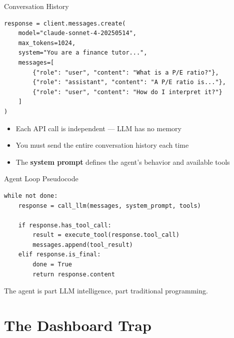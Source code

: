 \documentclass[aspectratio=169]{beamer}
\begin{document}
\begin{frame}[fragile,shrink=5]{Conversation History}
\begin{shadedbox}[title=\textbf{Messages Are a List of Dictionaries}]
\begin{verbatim}
response = client.messages.create(
    model="claude-sonnet-4-20250514",
    max_tokens=1024,
    system="You are a finance tutor...",
    messages=[
        {"role": "user", "content": "What is a P/E ratio?"},
        {"role": "assistant", "content": "A P/E ratio is..."},
        {"role": "user", "content": "How do I interpret it?"}
    ]
)
\end{verbatim}
\end{shadedbox}
\vspace{0.3cm}
\begin{itemize}\small
  \item Each API call is independent --- LLM has no memory
  \item You must send the \alert{entire conversation history} each time
  \item The \textbf{system prompt} defines the agent's behavior and available tools
\end{itemize}
\end{frame}

\begin{frame}[fragile]{Agent Loop Pseudocode}
\begin{shadedbox}[title=\textbf{The Agent's Decision Loop}]
\begin{verbatim}
while not done:
    response = call_llm(messages, system_prompt, tools)

    if response.has_tool_call:
        result = execute_tool(response.tool_call)
        messages.append(tool_result)
    elif response.is_final:
        done = True
        return response.content
\end{verbatim}
\end{shadedbox}
\vspace{0.3cm}
\begin{center}
\alert{The agent is part LLM intelligence, part traditional programming.}
\end{center}
\end{frame}

\section{The Dashboard Trap}
\end{document}
